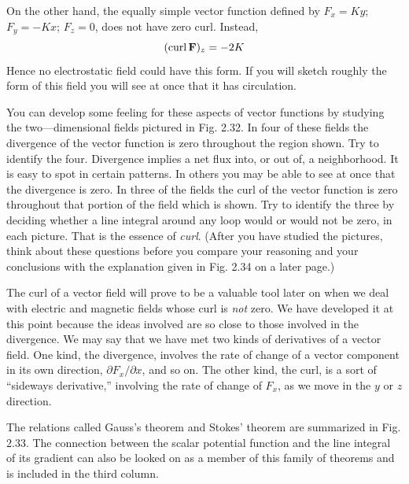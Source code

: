 On the other hand, the equally simple vector function defined by
$F_x = Ky$; $F_y = -Kx$; $F_z=0$, does not have zero curl. Instead,
\begin{equation}
  (\operatorname{curl}\mathbf{F})_z = -2K
\end{equation}
Hence no electrostatic field could have this form. If you will sketch
roughly the form of this field you will see at once that it has
circulation.

You can develop some feeling for these aspects of vector functions
by studying the two---dimensional fields pictured in Fig. 2.32. In four
of these fields the divergence of the vector function is zero throughout
the region shown. Try to identify the four. Divergence implies
a net flux into, or out of, a neighborhood. It is easy to spot in certain
patterns. In others you may be able to see at once that the divergence
is zero. In three of the fields the curl of the vector function is
zero throughout that portion of the field which is shown. Try to
identify the three by deciding whether a line integral around any
loop would or would not be zero, in each picture. That is the essence
of \emph{curl}. (After you have studied the pictures, think about these questions
before you compare your reasoning and your conclusions with
the explanation given in Fig. 2.34 on a later page.)

The curl of a vector field will prove to be a valuable tool later on
when we deal with electric and magnetic fields whose curl is \emph{not} zero.
We have developed it at this point because the ideas involved are so
close to those involved in the divergence. We may say that we have
met two kinds of derivatives of a vector field. One kind, the divergence,
involves the rate of change of a vector component in its own
direction, $\partial F_x/\partial x$, and so on. The other kind, the curl, is a sort of
``sideways derivative,'' involving the rate of change of $F_x$, as we move
in the $y$ or $z$ direction.

The relations called Gauss's theorem and Stokes' theorem are summarized
in Fig. 2.33. The connection between the scalar potential
function and the line integral of its gradient can also be looked on
as a member of this family of theorems and is included in the third
column.
